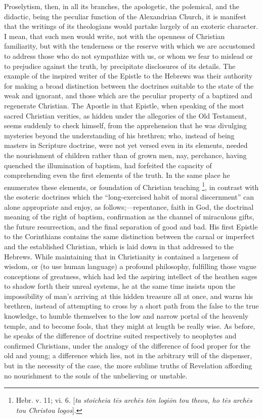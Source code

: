 Proselytism, then, in all its branches, the apologetic, the
polemical, and the didactic, being the peculiar function of the
Alexandrian Church, it is manifest that the writings of its
theologians would partake largely of an exoteric character. I mean,
that such men would write, not with the openness of Christian
familiarity, but with the tenderness or the reserve with which we are
accustomed to address those who do not sympathize with us, or whom we
fear to mislead or to prejudice against the truth, by precipitate
disclosures of its details. The example of the inspired writer of the
Epistle to the Hebrews was their authority for making a broad
distinction between the doctrines suitable to the state of the
weak and ignorant, and those which are the peculiar property of a
baptized and regenerate Christian. The Apostle in that Epistle, when
speaking of the most sacred Christian verities, as hidden under the
allegories of the Old Testament, seems suddenly to check himself, from
the apprehension that he was divulging mysteries beyond the
understanding of his brethren; who, instead of being masters in
Scripture doctrine, were not yet versed even in its elements, needed
the nourishment of children rather than of grown men, nay, perchance,
having quenched the illumination of baptism, had forfeited the
capacity of comprehending even the first elements of the truth. In the
same place he enumerates these elements, or foundation of Christian
teaching \footnote{Hebr. v. 11; vi. 6. [\emph{ta stoicheia t\={e}s
arch\={e}s t\={o}n logi\={o}n tou theou, ho t\={e}s arch\={e}s
tou Christou logos}].}, in contrast
with the esoteric doctrines which the ``long-exercised habit of
moral discernment'' can alone appropriate and enjoy, as follows;—repentance,
faith in God, the doctrinal meaning of the right of baptism,
confirmation as the channel of miraculous gifts, the future
resurrection, and the final separation of good and bad. His first
Epistle to the Corinthians contains the same distinction between the
carnal or imperfect and the established Christian, which is laid down
in that addressed to the Hebrews. While maintaining that in
Christianity is contained a largeness of wisdom, or (to use human
language) a profound philosophy, fulfilling those vague conceptions of
greatness, which had led the aspiring intellect of the heathen sages
to shadow forth their unreal systems, he at the same time insists upon the impossibility of man's arriving at this hidden treasure all
at once, and warns his brethren, instead of attempting to cross by a
short path from the false to the true knowledge, to humble themselves
to the low and narrow portal of the heavenly temple, and to become
fools, that they might at length be really wise. As before, he speaks
of the difference of doctrine suited respectively to neophytes and
confirmed Christians, under the analogy of the difference of food
proper for the old and young; a difference which lies, not in the
arbitrary will of the dispenser, but in the necessity of the case, the
more sublime truths of Revelation affording no nourishment to the
souls of the unbelieving or unstable.


